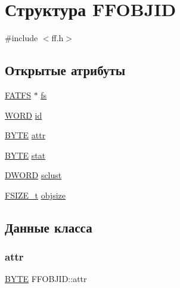 \hypertarget{struct_f_f_o_b_j_i_d}{}\section{Структура F\+F\+O\+B\+J\+ID}
\label{struct_f_f_o_b_j_i_d}


{\ttfamily \#include $<$ff.\+h$>$}

\subsection*{Открытые атрибуты}
\begin{DoxyCompactItemize}
\item 
\mbox{\hyperlink{struct_f_a_t_f_s}{F\+A\+T\+FS}} $\ast$ \mbox{\hyperlink{struct_f_f_o_b_j_i_d_a867089659a2374d44ab917c60037fe5c}{fs}}
\item 
\mbox{\hyperlink{ff_8h_a197942eefa7db30960ae396d68339b97}{W\+O\+RD}} \mbox{\hyperlink{struct_f_f_o_b_j_i_d_afc765e01ff97bfd9645c42b0ba30397f}{id}}
\item 
\mbox{\hyperlink{ff_8h_a4ae1dab0fb4b072a66584546209e7d58}{B\+Y\+TE}} \mbox{\hyperlink{struct_f_f_o_b_j_i_d_ae9b1e6f98dbad367cc00f92b87f8d279}{attr}}
\item 
\mbox{\hyperlink{ff_8h_a4ae1dab0fb4b072a66584546209e7d58}{B\+Y\+TE}} \mbox{\hyperlink{struct_f_f_o_b_j_i_d_aa7bfa8dd8958d11df042a67e1da25f63}{stat}}
\item 
\mbox{\hyperlink{ff_8h_ad342ac907eb044443153a22f964bf0af}{D\+W\+O\+RD}} \mbox{\hyperlink{struct_f_f_o_b_j_i_d_ad990393e2ddf16f73671ded4b751becb}{sclust}}
\item 
\mbox{\hyperlink{ff_8h_a3fc0992ad7436250b6b1a0592214b7f2}{F\+S\+I\+Z\+E\+\_\+t}} \mbox{\hyperlink{struct_f_f_o_b_j_i_d_a83c51ba99687054f0cc653b45f195268}{objsize}}
\end{DoxyCompactItemize}


\subsection{Данные класса}
\mbox{\label{struct_f_f_o_b_j_i_d_ae9b1e6f98dbad367cc00f92b87f8d279}} 
\subsubsection{\texorpdfstring{attr}{attr}}
{\footnotesize\ttfamily \mbox{\hyperlink{ff_8h_a4ae1dab0fb4b072a66584546209e7d58}{B\+Y\+TE}} F\+F\+O\+B\+J\+I\+D\+::attr}

